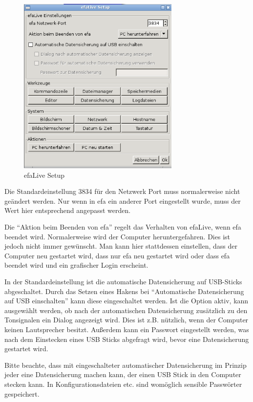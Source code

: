 \documentclass[a4paper,12pt,twoside]{article}
\begin{document}
\begin{figure}
    \centering
    \includegraphics[width=8cm]{efaLivede-img/efaLive_efaLiveSetup_de.png}
    \caption{efaLive Setup}
    \label{fig:efalivesetup}
\end{figure}

Die Standardeinstellung 3834 für den Netzwerk Port muss normalerweise nicht 
geändert werden. Nur wenn in efa ein
anderer Port eingestellt wurde, muss der Wert hier entsprechend
angepasst werden.

Die "`Aktion beim Beenden von efa"' regelt das
Verhalten von efaLive, wenn efa beendet wird. Normalerweise wird der
Computer heruntergefahren. Dies ist jedoch nicht immer gewünscht. Man
kann hier stattdessen einstellen, dass der Computer neu gestartet wird, 
dass nur efa neu gestartet wird oder dass efa beendet wird und ein 
grafischer Login erscheint.

In der Standardeinstellung ist die automatische Datensicherung auf
USB-Sticks abgeschaltet. Durch das Setzen eines Hakens bei
"`Automatische Datensicherung auf USB
einschalten"' kann diese eingeschaltet werden. Ist die
Option aktiv, kann ausgewählt werden, ob nach der automatischen
Datensicherung zusätzlich zu den Tonsignalen ein Dialog angezeigt wird.
Dies ist z.B. nützlich, wenn der Computer keinen Lautsprecher besitzt. 
Außerdem kann ein Passwort eingestellt werden, was nach dem Einstecken
eines USB Sticks abgefragt wird, bevor eine Datensicherung gestartet wird.

Bitte beachte, dass mit eingeschalteter automatischer Datensicherung im
Prinzip jeder eine Datensicherung machen kann, der einen USB Stick in
den Computer stecken kann. In Konfigurationsdateien etc. sind womöglich
sensible Passwörter gespeichert.
\end{document}
